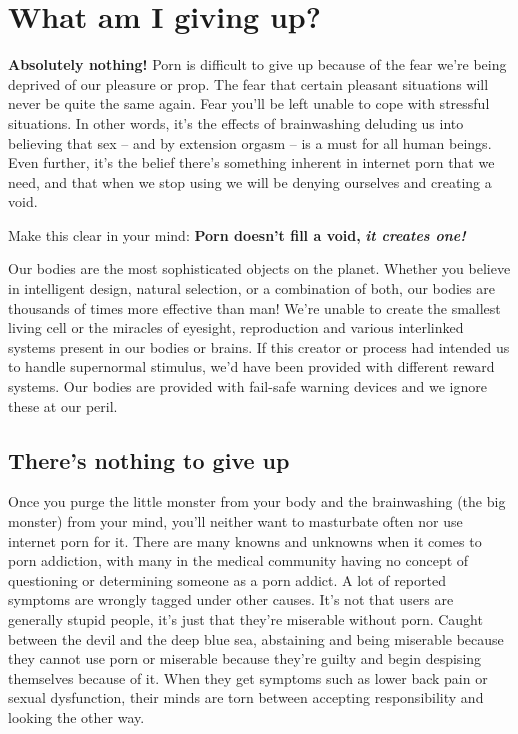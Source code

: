 \documentclass[
]{book}
\begin{document}
\hypertarget{what-am-i-giving-up}{%
\chapter{What am I giving up?}\label{what-am-i-giving-up}}

\textbf{Absolutely nothing!} Porn is difficult to give up because of the fear we're being deprived of our pleasure or prop. The fear that certain pleasant situations will never be quite the same again. Fear you'll be left unable to cope with stressful situations. In other words, it's the effects of brainwashing deluding us into believing that sex -- and by extension orgasm -- is a must for all human beings. Even further, it's the belief there's something inherent in internet porn that we need, and that when we stop using we will be denying ourselves and creating a void.

Make this clear in your mind: \textbf{Porn doesn't fill a void,} \textbf{\emph{it creates one!}}

Our bodies are the most sophisticated objects on the planet. Whether you believe in intelligent design, natural selection, or a combination of both, our bodies are thousands of times more effective than man! We're unable to create the smallest living cell or the miracles of eyesight, reproduction and various interlinked systems present in our bodies or brains. If this creator or process had intended us to handle supernormal stimulus, we'd have been provided with different reward systems. Our bodies are provided with fail-safe warning devices and we ignore these at our peril.

\hypertarget{theres-nothing-to-give-up}{%
\section{There's nothing to give up}\label{theres-nothing-to-give-up}}

Once you purge the little monster from your body and the brainwashing (the big monster) from your mind, you'll neither want to masturbate often nor use internet porn for it. There are many knowns and unknowns when it comes to porn addiction, with many in the medical community having no concept of questioning or determining someone as a porn addict. A lot of reported symptoms are wrongly tagged under other causes. It's not that users are generally stupid people, it's just that they're miserable without porn. Caught between the devil and the deep blue sea, abstaining and being miserable because they cannot use porn or miserable because they're guilty and begin despising themselves because of it. When they get symptoms such as lower back pain or sexual dysfunction, their minds are torn between accepting responsibility and looking the other way.
\end{document}
